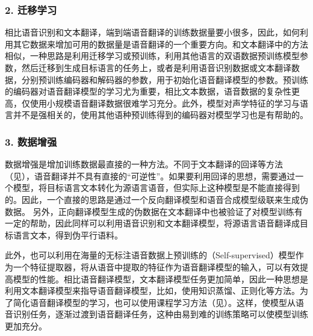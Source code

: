 \subsubsection{2. 迁移学习}

\parinterval 相比语音识别和文本翻译，端到端语音翻译的训练数据量要小很多，因此，如何利用其它数据来增加可用的数据量是语音翻译的一个重要方向。和文本翻译中的方法相似，一种思路是利用迁移学习或预训练，利用其他语言的双语数据预训练模型参数，然后迁移到生成目标语言的任务上，或者是利用语音识别数据或文本翻译数据，分别预训练编码器和解码器的参数，用于初始化语音翻译模型的参数。预训练的编码器对语音翻译模型的学习尤为重要，相比文本数据，语音数据的复杂性更高，仅使用小规模语音翻译数据很难学习充分。此外，模型对声学特征的学习与语言并不是强相关的，使用其他语种预训练得到的编码器对模型学习也是有帮助的。

\subsubsection{3. 数据增强}

\parinterval 数据增强是增加训练数据最直接的一种方法。不同于文本翻译的回译等方法（见{\chaptersixteen}），语音翻译并不具有直接的“可逆性”。如果要利用回译的思想，需要通过一个模型，将目标语言文本转化为源语言语音，但实际上这种模型是不能直接得到的。因此，一个直接的思路是通过一个反向翻译模型和语音合成模型级联来生成伪数据。 另外，正向翻译模型生成的伪数据在文本翻译中也被验证了对模型训练有一定的帮助，因此同样可以利用语音识别和文本翻译模型，将源语言语音翻译成目标语言文本，得到伪平行语料。


\parinterval 此外，也可以利用在海量的无标注语音数据上预训练的{\small{}}（Self-supervised）模型作为一个特征提取器，将从语音中提取的特征作为语音翻译模型的输入，可以有效提高模型的性能。相比语音翻译模型，文本翻译模型任务更加简单，因此一种思想是利用文本翻译模型来指导语音翻译模型，比如，使用知识蒸馏、正则化等方法。为了简化语音翻译模型的学习，也可以使用课程学习方法（见{\chapterthirteen}）。这样，使模型从语音识别任务，逐渐过渡到语音翻译任务，这种由易到难的训练策略可以使模型训练更加充分。

